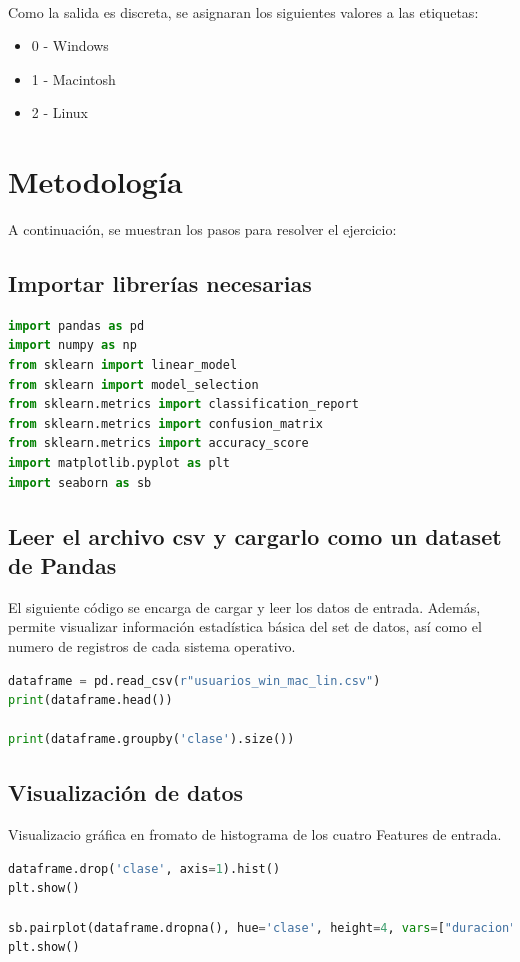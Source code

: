 \documentclass{article}
\begin{document}
\paragraph{} Como la salida es discreta, se asignaran los siguientes valores a las etiquetas:
\begin{itemize}
    \item 0 - Windows
    \item 1 - Macintosh
    \item 2 - Linux
\end{itemize}

\newpage
\section{Metodología}
A continuación, se muestran los pasos para resolver el ejercicio:

\subsection{Importar librerías necesarias} 
\begin{lstlisting}[language=Python]
import pandas as pd
import numpy as np
from sklearn import linear_model
from sklearn import model_selection
from sklearn.metrics import classification_report
from sklearn.metrics import confusion_matrix
from sklearn.metrics import accuracy_score
import matplotlib.pyplot as plt
import seaborn as sb
\end{lstlisting}

\subsection{Leer el archivo csv y cargarlo como un dataset de Pandas}El siguiente código se encarga de cargar y leer los datos de entrada. Además,  permite visualizar información estadística básica del set de datos, así como el numero de registros de cada sistema operativo.
\begin{lstlisting}[language=Python]
dataframe = pd.read_csv(r"usuarios_win_mac_lin.csv")
print(dataframe.head())

print(dataframe.groupby('clase').size())
\end{lstlisting}

\subsection{Visualización de datos} Visualizacio gráfica en fromato de histograma de los cuatro Features de entrada.
\begin{lstlisting}[language=Python]
dataframe.drop('clase', axis=1).hist()
plt.show()

sb.pairplot(dataframe.dropna(), hue='clase', height=4, vars=["duracion", "paginas","acciones","valor"], kind='reg')
plt.show()
\end{lstlisting}
\end{document}
